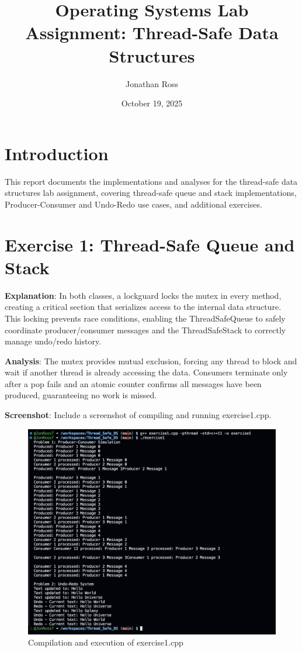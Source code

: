 \documentclass[a4paper]{article}
\begin{document}
\title{Operating Systems Lab Assignment: Thread-Safe Data Structures}
\author{Jonathan Ross}
\date{October 19, 2025}
\maketitle

\section{Introduction}
This report documents the implementations and analyses for the thread-safe data structures lab
assignment, covering thread-safe queue and stack implementations, Producer-Consumer and
Undo-Redo use cases, and additional exercises.

\section{Exercise 1: Thread-Safe Queue and Stack}

\textbf{Explanation}: In both classes, a lockguard locks the mutex in every method, creating a critical section that serializes access to the internal data structure. This locking prevents race conditions, enabling the ThreadSafeQueue to safely coordinate producer/consumer messages and the ThreadSafeStack to correctly manage undo/redo history.

\textbf{Analysis}: The mutex provides mutual exclusion, forcing any thread to block and wait if another thread is already accessing the data. Consumers terminate only after a pop fails and an atomic counter confirms all messages have been produced, guaranteeing no work is missed.

\textbf{Screenshot}: Include a screenshot of compiling and running exercise1.cpp.
\begin{figure}[H]
    \centering
    \includegraphics[width=\textwidth]{exercise1.png}
    \caption{Compilation and execution of exercise1.cpp}
\end{figure}
\end{document}
